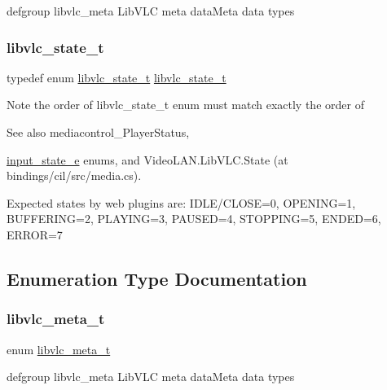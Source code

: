 defgroup libvlc\+\_\+meta Lib\+V\+LC meta data\+Meta data types \mbox{\label{group__libvlc__media_gaffb7eef042375f78ec9a6f1ae11ae0c3}} 
\subsubsection{\texorpdfstring{libvlc\+\_\+state\+\_\+t}{libvlc\_state\_t}}
{\footnotesize\ttfamily typedef enum \hyperlink{group__libvlc__media_gac88ad60037ea05e1f23675a2ebe31efc}{libvlc\+\_\+state\+\_\+t}  \hyperlink{group__libvlc__media_gac88ad60037ea05e1f23675a2ebe31efc}{libvlc\+\_\+state\+\_\+t}}

Note the order of libvlc\+\_\+state\+\_\+t enum must match exactly the order of \begin{DoxySeeAlso}{See also}
mediacontrol\+\_\+\+Player\+Status, 

\hyperlink{vlc__input_8h_a158f30c7fe25669dd399e71e5924ae3f}{input\+\_\+state\+\_\+e} enums, and Video\+L\+A\+N.\+Lib\+V\+L\+C.\+State (at bindings/cil/src/media.\+cs).
\end{DoxySeeAlso}
Expected states by web plugins are\+: I\+D\+L\+E/\+C\+L\+O\+SE=0, O\+P\+E\+N\+I\+NG=1, B\+U\+F\+F\+E\+R\+I\+NG=2, P\+L\+A\+Y\+I\+NG=3, P\+A\+U\+S\+ED=4, S\+T\+O\+P\+P\+I\+NG=5, E\+N\+D\+ED=6, E\+R\+R\+OR=7 

\subsection{Enumeration Type Documentation}
\mbox{\label{group__libvlc__media_ga90e7814a020f87d4c443d8d09b6dd4a0}} 
\subsubsection{\texorpdfstring{libvlc\+\_\+meta\+\_\+t}{libvlc\_meta\_t}}
{\footnotesize\ttfamily enum \hyperlink{group__libvlc__media_ga90e7814a020f87d4c443d8d09b6dd4a0}{libvlc\+\_\+meta\+\_\+t}}

defgroup libvlc\+\_\+meta Lib\+V\+LC meta data\+Meta data types \mbox{\label{group__libvlc__media_gac88ad60037ea05e1f23675a2ebe31efc}} 
